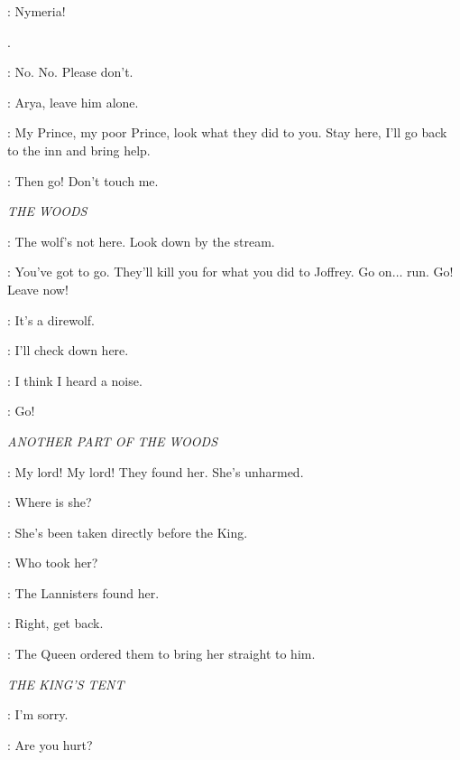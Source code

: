 \ARYA: Nymeria! 

.

\JOFFREY: No. No. Please don't. 

\SANSA: Arya, leave him alone. 


\SANSA: My Prince, my poor Prince, look what they did to you. Stay here, I'll go back to the inn and bring help. 

\JOFFREY: Then go! Don't touch me. 

\scene

\textit{THE WOODS}


\SOLDIERa: The wolf's not here. Look down by the stream. 

\ARYA: You've got to go. They'll kill you for what you did to Joffrey. Go on$\ldots$ run. Go! Leave now! 

\SOLDIERb: It's a direwolf. 

\SOLDIERa: I'll check down here. 

\SOLDIERb: I think I heard a noise. 

\ARYA: Go! 


\scene

\textit{ANOTHER PART OF THE WOODS}


\JORY: My lord! My lord! They found her. She's unharmed. 

\NED: Where is she? 

\JORY: She's been taken directly before the King. 

\NED: Who took her? 

\JORY: The Lannisters found her. 

\NED: Right, get back. 

\JORY: The Queen ordered them to bring her straight to him. 


\scene

\textit{THE KING'S TENT}


\ARYA: I'm sorry. 

\NED: Are you hurt? 

